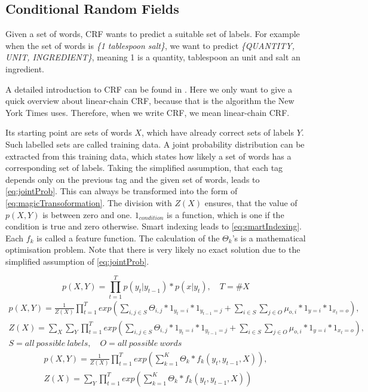 \documentclass[12pt, twoside]{report}
\begin{document}
\subsection{Conditional Random Fields}
Given a set of words, CRF wants to predict a suitable set of labels. For example when the set of words is \textit{\{1 tablespoon salt\}}, we want to predict \textit{\{QUANTITY, UNIT, INGREDIENT\}}, meaning 1 is a quantity, tablespoon an unit and salt an ingredient.

A detailed introduction to CRF can be found in \parencite{CRFIntroduction}. Here we only want to give a quick overview about linear-chain CRF, because that is the algorithm the New York Times uses. Therefore, when we write CRF, we mean linear-chain CRF.

Its starting point are sets of words $X$, which have already correct sets of labels $Y$. Such labelled sets are called training data. A joint probability distribution can be extracted from this training data, which states how likely a set of words has a corresponding set of labels. Taking the simplified assumption, that each tag depends only on the previous tag and the given set of words, leads to \cref{eq:jointProb}. This can always be transformed into the form of \cref{eq:magicTransoformation}. The division with $Z(X)$ ensures, that the value of $p(X,Y)$ is between zero and one. $1_{condition}$ is a function, which is one if the condition is true and zero otherwise. Smart indexing leads to \cref{eq:smartIndexing}. Each $f_k$ is called a feature function. The calculation of the $\Theta_k$'s is a mathematical optimisation problem. Note that there is very likely no exact solution due to the simplified assumption of \cref{eq:jointProb}.

\begin{equation} \label{eq:jointProb}
p(X,Y) = \prod_{t=1}^T p(y_t|y_{t-1}) * p(x|y_t), \quad T = \#X
\end{equation}
\begin{align}\label{eq:magicTransoformation}
p(X,Y) = \frac{1}{Z(X)}\prod_{t=1}^T exp(\sum_{i,j\in S}^{} \Theta_{i,j} * 1_{y_t=i} * 1_{y_{t-1}=j} + \sum_{i \in S}^{} \sum_{j \in O}^{} \mu_{o,i} * 1_{y=i} * 1_{x_t=o}), \nonumber
\\
Z(X) = \sum_{X}^{}\sum_{Y}^{}\prod_{t=1}^T exp(\sum_{i,j\in S}^{} \Theta_{i,j} * 1_{y_t=i} * 1_{y_{t-1}=j} + \sum_{i \in S}^{} \sum_{j \in O}^{} \mu_{o,i} * 1_{y=i} * 1_{x_t=o}), \nonumber
\\
S = all\ possible\ labels, \quad O = all\ possible\ words
\end{align}
\begin{align} \label{eq:smartIndexing}
p(X,Y) = \frac{1}{Z(X)}\prod_{t=1}^T exp(\sum_{k=1}^{K} \Theta_{k} * f_k(y_t, y_{t-1}, X)), \nonumber
\\
Z(X) = \sum_{Y}^{}\prod_{t=1}^T exp(\sum_{k=1}^{K} \Theta_{k} * f_k(y_t, y_{t-1}, X))
\end{align}
\end{document}
